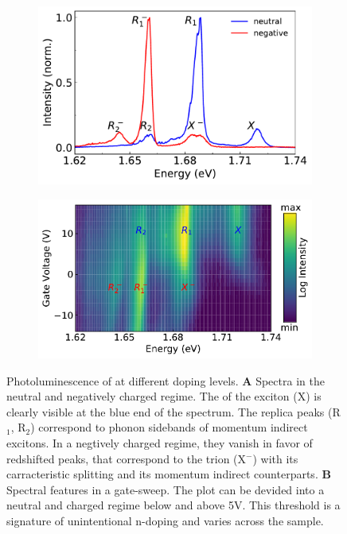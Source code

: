 \begin{figure}[h]
	\begin{subfigure}{0.49\textwidth}
		\caption{}
		\includegraphics[height=0.65\textwidth]{spectrum_neutral_negative}
	\end{subfigure}
	\begin{subfigure}{0.49\textwidth}
		\caption{}
		\includegraphics[height=0.65\textwidth]{Voltsweep}
	\end{subfigure}
	\caption{Photoluminescence of \wse at different doping levels. \textbf{A} Spectra in the neutral and negatively charged regime. The \pl of the exciton (X) is clearly visible at the blue end of the spectrum. The replica peaks (R$_1$, R$_2$) correspond to phonon sidebands of momentum indirect excitons. In a negtively charged regime, they vanish in favor of redshifted peaks, that correspond to the trion (X$^-$) with its carracteristic splitting and its momentum indirect counterparts. \textbf{B} Spectral features in a gate-sweep. The plot can be devided into a neutral and charged regime below and above 5V. This threshold is a signature of unintentional n-doping and varies across the sample.}\label{plspectrum}
\end{figure}

